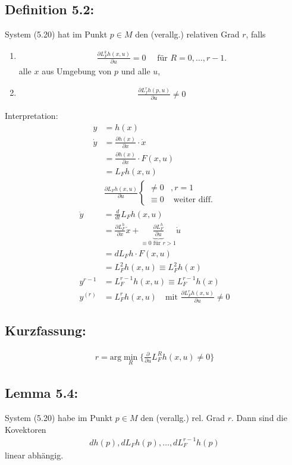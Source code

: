\documentclass[ngerman]{tudscrreprt}
\begin{document}
\subsection*{Definition 5.2: } System (5.20) hat im Punkt $p \in M$ den (verallg.) relativen Grad $r$, falls 
\begin{enumerate}
\item \begin{align*}
\frac{\partial L_F^k h(x,u)}{\partial u} = 0 \quad \text{ für } R = 0,\dots, r-1.
\end{align*}
alle $x$ aus Umgebung von $p$ und alle $u$, 
\item \begin{align*} \frac{\partial L_f^r h(p,u)}{\partial u} \ne 0 \end{align*}
\end{enumerate}
Interpretation:
\begin{align*}
y &= h(x)\\ 
\dot y&= \frac{\partial h(x)}{\partial x}\cdot \dot x\\ 
&= \frac{\partial h(x)}{\partial x} \cdot F(x,u)\\ 
&= L_F h (x,u)\\ 
& \frac{\partial L_F h(x,u)}{\partial u} \left\{ \begin{matrix} \ne 0& , r=1\\ \equiv 0& \text{ weiter diff.}\end{matrix} \right.
\end{align*}
\begin{align*}
\ddot y &= \frac{d}{dt} L_F h(x,u)\\ 
&= \frac{\partial L_F^h}{\partial x}\dot x +\underbrace{\frac{\partial L_F^h}{\partial u} }_{\equiv 0 \text{ für } r > 1} \dot u\\ 
&= dL_F h\cdot F(x,u) \\ 
&= L_F^2 h(x,u) \equiv L_F^2 h(x)\\ 
y^{r-1}&= L_F^{r-1}h(x,u) \equiv L_F^{r-1}h(x)\\ 
y^{(r)}&= L_F^rh(x,u) \quad \text{mit } \frac{\partial L_F^r h(x,u)}{\partial u} \ne 0
\end{align*}
\subsection*{Kurzfassung:}
\begin{align*}
r = \text{arg} \min\limits_{R}\{\frac{\partial }{\partial u} L_F^R h(x,u) \ne 0\}
\end{align*}
\subsection*{Lemma 5.4:} System (5.20) habe im Punkt $p \in M$ den (verallg.) rel. Grad $r$. Dann sind die Kovektoren \begin{align*}dh(p), dL_F h(p), \dots, dL_F^{r-1} h(p) \end{align*} linear abhängig.
\end{document}
